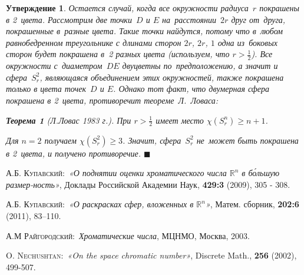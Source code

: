 \documentclass{report}%
\newtheorem{theorem}{Теорема}
\newtheorem{claim}{Утверждение}
\newenvironment{proof}{\par\noindent{\bf Доказательство.}}{\hfill$\scriptstyle\blacksquare$}
\begin{document}
\begin{claim}
\begin{proof}
				\noindent Остается случай, когда все окружности радиуса~$r$ покрашены в 2~цвета.
				Рассмотрим две точки~$D$ и $E$ на~расстоянии~$2r$ друг от~друга, покрашенные в~разные цвета.
				Такие точки найдутся, потому что в~любом равнобедренном треугольнике с длинами сторон $2r$, $2r$, $1$
				одна из~боковых сторон будет покрашена в~2 разных цвета (используем, что $r > \frac{1}{2}$).
				Все окружности с~диаметром~$DE$ двуцветны по~предположению, а значит и сфера~$S_r^2$,
				являющаяся объединением этих окружностей, также покрашена только в цвета точек~$D$ и $E$.
				Однако тот факт, что двумерная сфера покрашена в 2~цвета, противоречит теореме~Л.~Ловаса:
				
				\begin{theorem}[Л.Ловас 1983 г.]
						При $r > \frac{1}{2}$ имеет место $\chi(S_r^n) \geq n + 1$.
				\end{theorem}
				Для $n = 2$ получаем $\chi(S_r^2) \geq 3$.
				Значит, сфера~$S_r^2$ не~может быть покрашена в 2~цвета, и получено противоречие.
		\end{proof}
\end{claim}

\begin{thebibliography}{4}

 \textsc{А.Б. Купавский}:\ \textit{«О поднятии оценки хроматического числа
 $\mathbb{R}^n$ в б\'{о}льшую размер-ность»},  Доклады Российской Академии Наук, \textbf{429:3} (2009), 305 - 308.

 \textsc{А.Б. Купавский}:\ \textit{«О раскрасках сфер, вложенных в $\mathbb{R}^n$»},
Матем. сборник, \textbf{202:6} (2011), 83–110.

 \textsc{А.М Райгородский}:\ \textit{Хроматические числа}, МЦНМО, Москва, 2003.

 \textsc{O. Nechushtan}:\ \textit{«On the space chromatic number»},
 Discrete Math., \textbf{256} (2002), 499-507.

\end{thebibliography}
\end{document}

